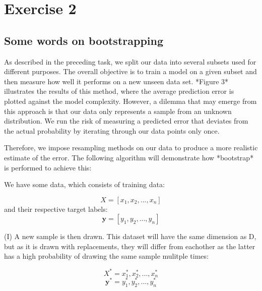 \documentclass[11pt, a4paper]{article}
\begin{document}




\section*{Exercise 2}
\subsection*{Some words on bootstrapping}
As described in the preceding task, we split our data into several subsets used for different purposes. The overall objective is to train a model on a given subset and then measure how well it performs on a new unseen data set. *Figure 3* illustrates the results of this method, where the average prediction error is plotted against the model complexity. However, a dilemma that may emerge from this approach is that our data only represents a sample from an unknown distribution. We run the risk of measuring a predicted error that deviates from the actual probability by iterating through our data points only once. 

Therefore, we impose resampling methods on our data to produce a more realistic estimate of the error. The following algorithm will demonstrate how *bootstrap* is performed to achieve this\cite{ref_forelesning}:

We have some data, which consists of training data: 

$$X = [x_1,x_2,...,x_n]$$
 and their respective target labels:
 $$\bm{y} = [y_1,y_2,...,y_n]$$


(I) A new sample is then drawn. This dataset will have the same dimension as D, but as it is drawn with replacements, they will differ from eachother as the latter has a high probability of drawing the same sample mulitple times:

$$X^* = x_{1}^{*}, x_{2}^{*}, ... ,x_{n}^{*}$$
$$\bm{y}^*= y_{1}^{*}, y_{2}^{*}, ... ,y_{n}^{*}$$
\end{document}
